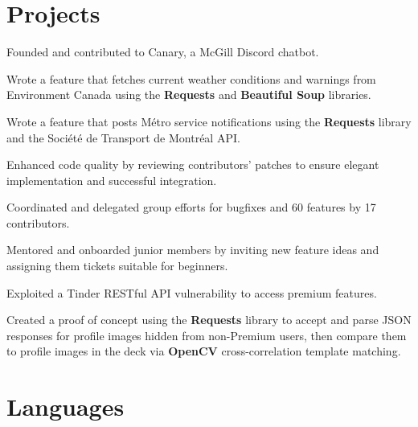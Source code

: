 \documentclass[]{jidicula-resume}
\begin{document}
\newpage
\section{Projects}

\begin{tightemize}
\item Founded and contributed to Canary, a McGill Discord chatbot.
  \item Wrote a feature that fetches current weather conditions and warnings from Environment Canada using the \textbf{Requests} and \textbf{Beautiful Soup} libraries.
  \item Wrote a feature that posts M\'etro service notifications using the \textbf{Requests} library and the Soci\'et\'e de Transport de Montr\'eal API.
  \item Enhanced code quality by reviewing contributors' patches to ensure elegant implementation and successful integration.
  \item Coordinated and delegated group efforts for bugfixes and 60 features by 17 contributors.
  \item Mentored and onboarded junior members by inviting new feature ideas and assigning them tickets suitable for beginners.
\end{tightemize}
\sectionsep{}

\begin{tightemize}
\item Exploited a Tinder RESTful API vulnerability to access premium features.
\item Created a proof of concept using the \textbf{Requests} library to accept and parse JSON responses for profile images hidden from non-Premium users, then compare them to profile images in the deck via \textbf{OpenCV} cross-correlation template matching.
\end{tightemize}
\sectionsep{}

\section{Languages}
\end{document}
